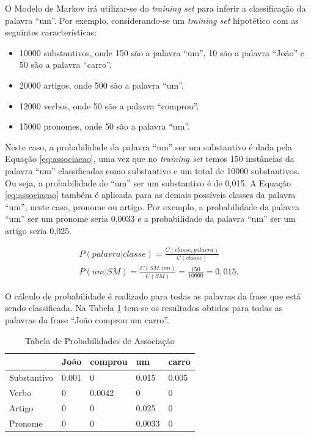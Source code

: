 O Modelo de Markov irá utilizar-se do \textit{training set} para inferir a
classificação da palavra ``um''. Por exemplo, considerando-se um
\textit{training set} hipotético com as seguintes características:

\begin{itemize}
  \item 10000 substantivos, onde 150 são a palavra ``um'', 10 são a palavra
  ``João'' e 50 são a palavra ``carro''.
  \item 20000 artigos, onde 500 são a palavra ``um''.
  \item 12000 verbos, onde 50 são a palavra ``comprou''.
  \item 15000 pronomes, onde 50 são a palavra ``um''.
\end{itemize}

Neste caso, a probabilidade da palavra
``um'' ser um substantivo é dada pela Equação \ref{eq:associacao}, uma vez que
no \textit{training set} temos 150 instâncias da palavra ``um'' classificadas como
substantivo e um total de 10000 substantivos. Ou seja, a probabilidade de ``um'' ser um substantivo é
de 0,015. A Equação \ref{eq:associacao} também é aplicada para as demais
possíveis classes da palavra ``um'', neste caso, pronome ou artigo. Por exemplo, a
probabilidade da palavra ``um'' ser um pronome seria 0,0033 e a probabilidade da palavra ``um'' ser um artigo seria 0,025. 

\begin{equation}
\begin{split}
P(palavra|classe) = \frac{C(classe,palavra)}{C(classe)}  \\
P(um|SM) = \frac{C(SM,um)}{C(SM)} = \frac{150}{10000} = 0,015.
\end{split}
\label{eq:associacao}
\end{equation}

O
cálculo de probabilidade é realizado para todas as palavras da frase que está
sendo classificada. Na Tabela \ref{tabela:associacao} tem-se os resultados
obtidos para todas as palavras da frase ``João comprou um carro''.

\begin{table}[htb]
\centering
\begin{tabular}{|l|l|l|l|l|}
\hline
& João  & comprou & um     & carro  \\ \hline
Substantivo & 0.001 & 0       & 0.015  & 0.005  \\ \hline
Verbo       & 0     & 0.0042  & 0      & 0      \\ \hline
Artigo      & 0     & 0       & 0.025  & 0      \\ \hline
Pronome     & 0     & 0       & 0.0033 & 0      \\ \hline
\end{tabular}
\caption{Tabela de Probabilidades de Associação}
\label{tabela:associacao}
\end{table}

